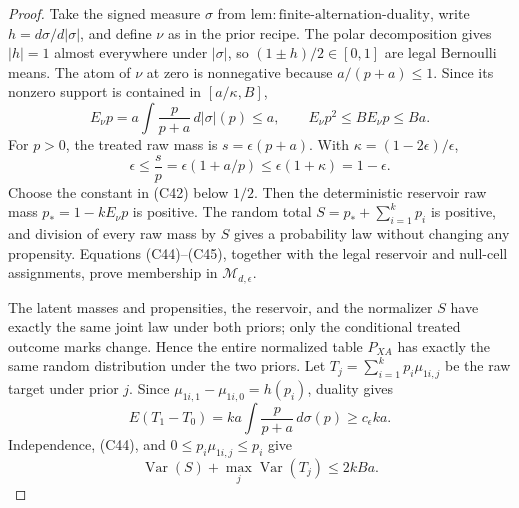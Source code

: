 \documentclass{article}
\begin{document}
\begin{proof}
Take the signed measure \(\sigma\) from \(\mathrm{lem:finite\mbox{-}alternation\mbox{-}duality}\), write \(h=d\sigma/d|\sigma|\), and define \(\nu\) as in the prior recipe.  The polar decomposition gives \(|h|=1\) almost everywhere under \(|\sigma|\), so \((1\pm h)/2\in[0,1]\) are legal Bernoulli means.  The atom of \(\nu\) at zero is nonnegative because \(a/(p+a)\le1\).  Since its nonzero support is contained in \([a/\kappa,B]\),
\[
 E_\nu p=a\int\frac p{p+a}\,d|\sigma|(p)\le a,
 \qquad E_\nu p^2\le B E_\nu p\le Ba.                             \tag{C44}
\]
For \(p>0\), the treated raw mass is \(s=\epsilon(p+a)\).  With \(\kappa=(1-2\epsilon)/\epsilon\),
\[
 \epsilon\le\frac sp=\epsilon(1+a/p)
 \le\epsilon(1+\kappa)=1-\epsilon.                                \tag{C45}
\]
Choose the constant in (C42) below \(1/2\).  Then the deterministic reservoir raw mass \(p_*=1-kE_\nu p\) is positive.  The random total \(S=p_*+\sum_{i=1}^kp_i\) is positive, and division of every raw mass by \(S\) gives a probability law without changing any propensity.  Equations (C44)--(C45), together with the legal reservoir and null-cell assignments, prove membership in \(\mathcal M_{d,\epsilon}\).

The latent masses and propensities, the reservoir, and the normalizer \(S\) have exactly the same joint law under both priors; only the conditional treated outcome marks change.  Hence the entire normalized table \(P_{XA}\) has exactly the same random distribution under the two priors.  Let \(T_j=\sum_{i=1}^kp_i\mu_{1i,j}\) be the raw target under prior \(j\).  Since \(\mu_{1i,1}-\mu_{1i,0}=h(p_i)\), duality gives
\[
 E(T_1-T_0)=ka\int\frac p{p+a}\,d\sigma(p)\ge c_\epsilon ka.       \tag{C46}
\]
Independence, (C44), and \(0\le p_i\mu_{1i,j}\le p_i\) give
\[
 \operatorname{Var}(S)+\max_j\operatorname{Var}(T_j)
 \le2kBa.                                                          \tag{C47}
\]


\end{proof}
\end{document}
